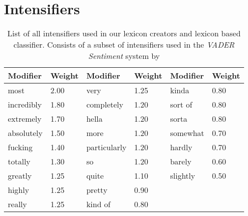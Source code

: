 \section{Intensifiers}
\begin{table}[H]
    \centering
    \begin{tabular}{| l | l || l | l || l | l |}
        \hline
        \textbf{Modifier} & \textbf{Weight} & \textbf{Modifier} & \textbf{Weight} & \textbf{Modifier} & \textbf{Weight}\\ \hline
        most & 2.00         & very & 1.25           & kinda & 0.80      \\ \hline
        incredibly & 1.80   & completely & 1.20     & sort of & 0.80    \\ \hline
        extremely & 1.70    & hella & 1.20          & sorta & 0.80      \\ \hline
        absolutely & 1.50   & more & 1.20           & somewhat & 0.70   \\ \hline
        fucking & 1.40      & particularly & 1.20   & hardly & 0.70     \\ \hline
        totally & 1.30      & so & 1.20             & barely & 0.60     \\ \hline
        greatly & 1.25      & quite & 1.10          & slightly & 0.50   \\ \hline
        highly & 1.25       & pretty & 0.90         & \multicolumn{2}{c|}{} \\ \hline
        really & 1.25       & kind of & 0.80        & \multicolumn{2}{c|}{} \\ \hline
    \end{tabular}
    \caption[List of all intensifiers used in our lexicon based system]{List of all intensifiers used in our lexicon creators and lexicon based classifier. Consists of a subset of intensifiers used in the \textit{VADER Sentiment} system by \cite{vaderSentiment}}
    \label{tab:intensifiers}
\end{table} 

